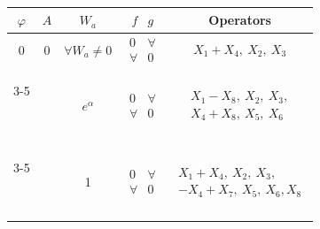 \begin{center} 


\begin{tabular}{|c|c|c|c|c|} 


\hline 


$\varphi$ & $A$ & $W_a$ & $\begin{matrix}f & g\end{matrix}$ & Operators \\ 


\hline 


0 & 0 & $\forall W_a\ne 0$ &


$\begin{matrix} 0 & \forall \\ \forall & 0\end{matrix}$ &


$\begin{matrix}X_1+X_4,\ X_2,\ X_3 \end{matrix}$ \\


\cline{3-5}


\ & \ & $e^\alpha$ & $\begin{matrix} 0 & \forall \\ \forall & 0\end{matrix}$


& $\begin{matrix}X_1-X_8,\ X_2,\ X_3,\\ X_4+X_8,\ X_5,\ X_6 \end{matrix}$ \\ 




\cline{3-5}


\ & \ & 1 & $\begin{matrix} 0 & \forall \\ \forall & 0\end{matrix}$


& $\begin{matrix}X_1+X_4,\ X_2,\ X_3,\\ -X_4+X_7,\ X_5,\ X_6, X_8 \end{matrix}$ \\ 


\hline


\end{tabular} 







\begin{tabular}{|c|c|c|c|c|c|} 



\end{tabular}
\end{center}
